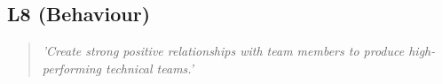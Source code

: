 \subsection*{L8 (Behaviour)}

  \begin{quote}
    \textit{'Create strong positive relationships with
    team members to produce high-performing technical
    teams.'}
  \end{quote}

\newpage